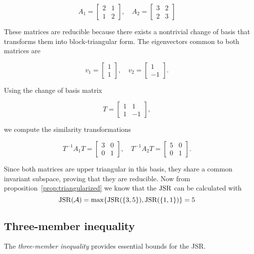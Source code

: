 \begin{example}
    \[
    A_1 = \begin{bmatrix} 2 & 1 \\ 1 & 2 \end{bmatrix}, \quad
    A_2 = \begin{bmatrix} 3 & 2 \\ 2 & 3 \end{bmatrix}
    \]

    These matrices are reducible because there exists a nontrivial change of basis that transforms them into block-triangular form. The eigenvectors common to both matrices are

    \[
    v_1 = \begin{bmatrix} 1 \\ 1 \end{bmatrix}, \quad
    v_2 = \begin{bmatrix} 1 \\ -1 \end{bmatrix}.
    \]

    Using the change of basis matrix

    \[
    T = \begin{bmatrix} 1 & 1 \\ 1 & -1 \end{bmatrix},
    \]

    we compute the similarity transformations

    \[
    T^{-1} A_1 T = \begin{bmatrix} 3 & 0 \\ 0 & 1 \end{bmatrix}, \quad
    T^{-1} A_2 T = \begin{bmatrix} 5 & 0 \\ 0 & 1 \end{bmatrix}.
    \]

    Since both matrices are upper triangular in this basis, they share a common invariant subspace, proving that they are reducible.
    Now from proposition~\ref{prop:triangularized} we know that the $\operatorname{JSR}$ can be calculated with 
    \[ 
    \operatorname{JSR}(\mathcal{A}) = \max \{ \operatorname{JSR}(\{3,5\}), \operatorname{JSR}(\{1,1\})\} = 5
    \]
\end{example}

\subsection*{Three-member inequality}
The \emph{three-member inequality} provides essential bounds for the JSR. 


